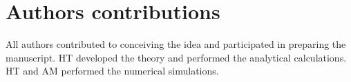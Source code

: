 \section{Authors contributions}
All authors contributed to conceiving the idea and participated in preparing the manuscript. HT developed the theory and performed the analytical calculations. HT and AM performed the numerical simulations.


%
%
%
%
%






